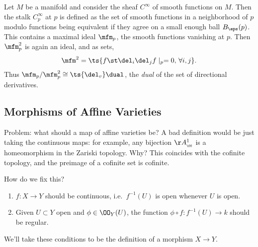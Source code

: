 \begin{example}

Let \(M\) be a manifold and consider the sheaf \(C^\infty\) of smooth
functions on \(M\). Then the stalk \(C_p^\infty\) at \(p\) is defined as
the set of smooth functions in a neighborhood of \(p\) modulo functions
being equivalent if they agree on a small enough ball \(B_\eps(p)\).
This contains a maximal ideal \(\mfm_p\), the smooth functions vanishing
at \(p\). Then \(\mfm_p^2\) is again an ideal, and as sets,
\begin{align*}  
\mfm^2 = \ts{f \st \del_i \del_j f\mid_p = 0,\, \forall i,j}
.\end{align*} Thus \(\mfm_p/\mfm_p^2 \cong \ts{\del_v}\dual\), the
\emph{dual} of the set of directional derivatives.

\end{example}

\hypertarget{morphisms-of-affine-varieties}{%
\subsection{Morphisms of Affine
Varieties}\label{morphisms-of-affine-varieties}}

Problem: what should a map of affine varieties be? A bad definition
would be just taking the continuous maps: for example, any bijection
\(\AA^1_{_\CC}\) is a homeomorphism in the Zariski topology. Why? This
coincides with the cofinite topology, and the preimage of a cofinite set
is cofinite.

\begin{question}

How do we fix this?

\end{question}

\begin{answer}

\envlist

\begin{enumerate}
\def\labelenumi{\arabic{enumi}.}
\item
  \(f:X\to Y\) should be continuous, i.e.~\(f^{-1} (U)\) is open
  whenever \(U\) is open.
\item
  Given \(U\subset Y\) open and \(\phi \in \OO_Y(U)\), the function
  \(\phi \circ f: f^{-1}(U) \to k\) should be regular.
\end{enumerate}

We'll take these conditions to be the definition of a morphism
\(X\to Y\).

\end{answer}

